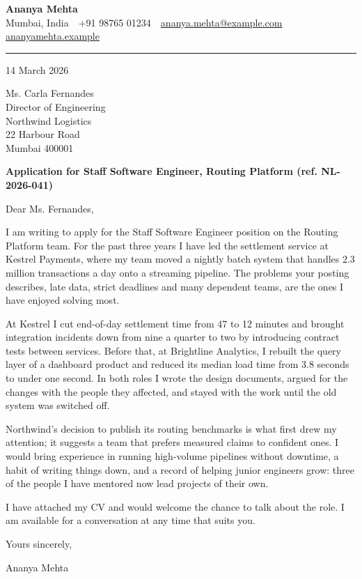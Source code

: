 \documentclass[11pt,a4paper]{article}
\begin{document}
{\Huge\bfseries\color{accent} Ananya Mehta}\\[4pt]
Mumbai, India \,\textbar\, +91 98765 01234 \,\textbar\,
\href{mailto:ananya.mehta@example.com}{ananya.mehta@example.com} \,\textbar\,
\href{https://ananyamehta.example}{ananyamehta.example}

{\color{accent}\rule{\linewidth}{0.8pt}}

14 March 2026

Ms. Carla Fernandes\\
Director of Engineering\\
Northwind Logistics\\
22 Harbour Road\\
Mumbai 400001

\textbf{Application for Staff Software Engineer, Routing Platform (ref. NL-2026-041)}

Dear Ms. Fernandes,

I am writing to apply for the Staff Software Engineer position on the Routing Platform team. For the past three years I have led the settlement service at Kestrel Payments, where my team moved a nightly batch system that handles 2.3 million transactions a day onto a streaming pipeline. The problems your posting describes, late data, strict deadlines and many dependent teams, are the ones I have enjoyed solving most.

At Kestrel I cut end-of-day settlement time from 47 to 12 minutes and brought integration incidents down from nine a quarter to two by introducing contract tests between services. Before that, at Brightline Analytics, I rebuilt the query layer of a dashboard product and reduced its median load time from 3.8 seconds to under one second. In both roles I wrote the design documents, argued for the changes with the people they affected, and stayed with the work until the old system was switched off.

Northwind's decision to publish its routing benchmarks is what first drew my attention; it suggests a team that prefers measured claims to confident ones. I would bring experience in running high-volume pipelines without downtime, a habit of writing things down, and a record of helping junior engineers grow: three of the people I have mentored now lead projects of their own.

I have attached my CV and would welcome the chance to talk about the role. I am available for a conversation at any time that suits you.

Yours sincerely,

\vspace{1.2cm}
Ananya Mehta
\end{document}
